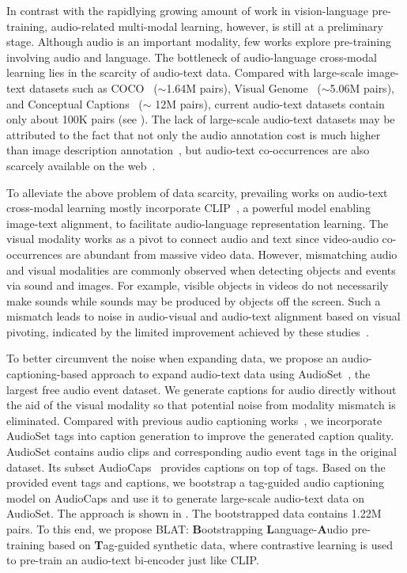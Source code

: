 \documentclass[sigconf]{acmart}
\begin{document}
In contrast with the rapidlying growing amount of work in vision-language pre-training, audio-related multi-modal learning, however, is still at 
a preliminary stage. 
Although audio is an important modality, few works explore pre-training involving audio and language.
The bottleneck of audio-language cross-modal learning lies in the 
scarcity of audio-text data.
Compared with large-scale image-text datasets such as COCO~\cite{lin2014microsoft} ($\sim$1.64M pairs), Visual Genome~\cite{krishna2017visual} ($\sim$5.06M pairs), and Conceptual Captions~\cite{sharma2018conceptual} ($\sim$ 12M pairs), current audio-text datasets contain only about 100K pairs (see ).
The lack of large-scale audio-text datasets may be attributed to the fact that not only the audio annotation cost is much higher than image description annotation~\cite{zhang2021enriching}, but audio-text co-occurrences are also scarcely available on the web~\cite{zhao2022connecting}.

To alleviate the above problem of data scarcity, prevailing works on audio-text cross-modal learning mostly incorporate CLIP~\cite{radford2021learning}, a powerful model enabling image-text alignment, to facilitate audio-language representation learning.
The visual modality works as a pivot to connect audio and text since video-audio co-occurrences are abundant from massive video data.
However, mismatching audio and visual modalities are commonly observed when detecting objects and events via sound and images.
For example, visible objects in videos do not necessarily make sounds 
while sounds may be produced by objects off the screen.
Such a mismatch leads to noise in audio-visual and audio-text alignment based on visual pivoting, indicated by the limited improvement achieved by these studies~\cite{zhao2022connecting,guzhov2022audioclip,wu2022wav2clip}.


To better circumvent the noise when expanding data, we propose an audio-captioning-based approach to expand audio-text data using AudioSet~\cite{gemmeke2017audio}, the largest free audio event dataset.
We generate captions for audio directly without the aid of the visual 
modality so that potential noise from modality mismatch is eliminated.
Compared with previous audio captioning works~\cite{chen2020audio,xu2021investigating}, we incorporate AudioSet tags into caption generation to improve 
the generated caption quality. 
AudioSet contains audio clips and corresponding audio event tags 
in the original dataset.
Its subset AudioCaps~\cite{kim2019audiocaps} provides captions on top of tags.
Based on the provided event tags and captions, we bootstrap a tag-guided audio captioning model on AudioCaps and use it to generate large-scale audio-text data on AudioSet.
The approach is shown in .
The bootstrapped data contains 1.22M pairs.
To this end, we propose BLAT: \textbf{B}ootstrapping \textbf{L}anguage-\textbf{A}udio pre-training based on \textbf{T}ag-guided synthetic data, where contrastive learning is used to pre-train an audio-text bi-encoder just like CLIP.
\end{document}
